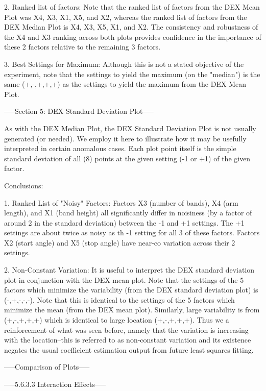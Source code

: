 2. Ranked list of factors: Note that the ranked
   list of factors from the DEX Mean Plot was X4, X3,
   X1, X5, and X2, whereas the ranked list of
   factors from the DEX Median Plot is X4, X3, X5,
   X1, and X2.  The consistency and robustness of
   the X4 and X3 ranking across both plots
   provides confidence in the importance of
   these 2 factors relative to the remaining 3
   factors.

3. Best Settings for Maximum: Although this is not
   a stated objective of the experiment, note that
   the settings to yield the maximum (on the
   "median") is the same (+,-,+,+,+) as the
   settings to yield the maximum from the DEX Mean
   Plot.

-----Section 5: DEX Standard Deviation Plot-----

As with the DEX Median Plot, the DEX Standard
Deviation Plot is not usually generated (or
needed).  We employ it here to illustrate how it
may be usefully interpreted in certain anomalous
cases.  Each plot point itself is the simple
standard deviation of all (8) points at the given
setting (-1 or +1) of the given factor.

Conclusions:

1. Ranked List of "Noisy" Factors:
   Factors X3 (number of bands), X4 (arm length),
   and X1 (band height) all significantly differ
   in noisiness (by a factor of around 2 in the
   standard deviation) between the -1 and +1
   settings.  The +1 settings are about twice as
   noisy as th -1 setting for all 3 of these
   factors.  Factors X2 (start angle) and X5 (stop
   angle) have near-co variation across their 2
   settings.

2. Non-Constant Variation: It is useful to interpret
   the DEX standard deviation plot in conjunction
   with the DEX mean plot.  Note that the settings
   of the 5 factors which minimize the variability
   (from the DEX standard deviation plot) is
   (-,+,-,-,-).  Note that this is identical to
   the settings of the 5 factors which minimize
   the mean (from the DEX mean plot).  Similarly,
   large variability is from (+,-,+,+,+) which is
   identical to large location (+,-,+,+,+).
   Thus we a reinforcement of what was seen
   before, namely that the variation is increasing
   with the location--this is referred to as
   non-constant variation and its existence
   negates the usual coefficient estimation output
   from future least squares fitting.

-----Comparison of Plots-----

-----5.6.3.3 Interaction Effects-----

